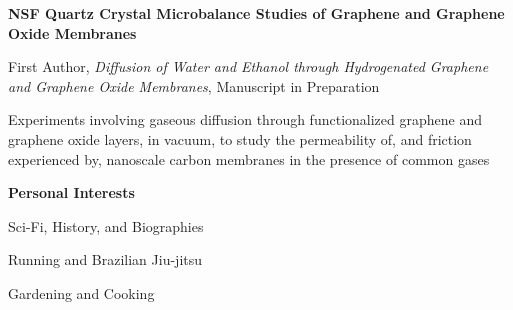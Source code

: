 \documentclass[letterpaper,final]{memoir}
\newcommand{\Sep}{\vspace{1.0em}}
\newcommand{\SmallSep}{\vspace{0.4em}}
\newcommand{\CVSection}[1]
	{\LARGE\textbf{#1}\par
	\SmallSep\normalsize}
\newcommand{\CVItem}[1]
	{\textbf{\color{Blue} #1}}
\begin{document}
\Sep
\CVItem{NSF Quartz Crystal Microbalance Studies of Graphene and Graphene Oxide Membranes} 
\SmallSep

\begin{compactitem}[\color{Blue}$\circ$]
    
    \item First Author, \textit{Diffusion of Water and Ethanol through Hydrogenated Graphene and Graphene Oxide Membranes}, 
                    Manuscript in Preparation
    \SmallSep
    \item Experiments involving gaseous diffusion through functionalized graphene and graphene oxide layers, in vacuum,
    to study the permeability of, and friction experienced by, nanoscale carbon membranes in the presence of common gases
	
\end{compactitem}

\Sep

\notoserif \CVSection{Personal Interests}
\normalfont

\begin{multicols}{3}
	\begin{compactitem}
		
		\item Sci-Fi, History, and Biographies
		\item Running and Brazilian Jiu-jitsu
        \item Gardening and Cooking
			
	\end{compactitem}
\end{multicols}
\end{document}
